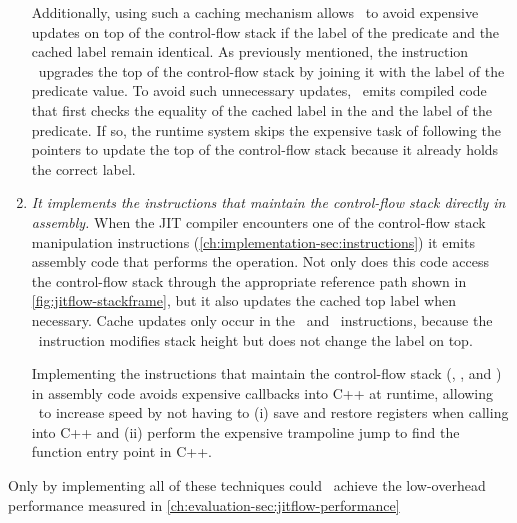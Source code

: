 \begin{enumerate}
Additionally, using such a caching mechanism allows \JitFlow\ to avoid expensive updates on top of the control-flow stack if the label of the predicate and the cached label remain identical.
As previously mentioned, the instruction \join\ upgrades the top of the control-flow stack by joining it with the label of the predicate value.
To avoid such unnecessary updates, \JitFlow\ emits compiled code that first checks the equality of the cached label in the  and the label of the predicate.
If so, the runtime system skips the expensive task of following the pointers to update the top of the control-flow stack because it already holds the correct label.

\item \textit{It implements the instructions that maintain the control-flow stack directly in assembly.}
When the JIT compiler encounters one of the control-flow stack manipulation instructions (\autoref{ch:implementation-sec:instructions}) it emits assembly code that performs the operation.
Not only does this code access the control-flow stack through the appropriate reference path shown in \autoref{fig:jitflow-stackframe}, but it also updates the cached top label when necessary.
Cache updates only occur in the \join\ and \popj\ instructions, because the \dup\ instruction modifies stack height but does not change the label on top.

Implementing the instructions that maintain the control-flow stack (\dup, \join, and \popj) in assembly code avoids expensive callbacks into C++ at runtime, allowing \JitFlow\ to increase speed by not having to (i) save and restore registers when calling into C++ and (ii) perform the expensive trampoline jump to find the function entry point in C++.

\end{enumerate}

Only by implementing all of these techniques could  \JitFlow\ achieve the low-overhead performance measured in \autoref{ch:evaluation-sec:jitflow-performance}


